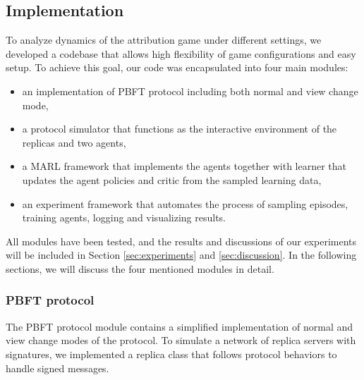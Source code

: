 \documentclass[a4paper,11pt]{article}
\begin{document}
\subsection{Implementation}\label{sec:codes}
To analyze dynamics of the attribution game under different settings, we developed a codebase that allows high flexibility of game configurations and easy setup. To achieve this goal, our code was encapsulated into four main modules:
\begin{itemize}
    \item an implementation of PBFT protocol including both normal and view change mode,
    \item a protocol simulator that functions as the interactive environment of the replicas and two agents,
    \item a MARL framework that implements the agents together with learner that updates the agent policies and critic from the sampled learning data,
    \item an experiment framework that automates the process of sampling episodes, training agents, logging and visualizing results.
\end{itemize}
All modules have been tested, and the results and discussions of our experiments will be included in Section \ref{sec:experiments} and \ref{sec:discussion}. In the following sections, we will discuss the four mentioned modules in detail.
\subsubsection{PBFT protocol}
The PBFT protocol module contains a simplified implementation of normal and view change modes of the protocol. To simulate a network of replica servers with signatures, we implemented a replica class that follows protocol behaviors to handle signed messages.
\end{document}
